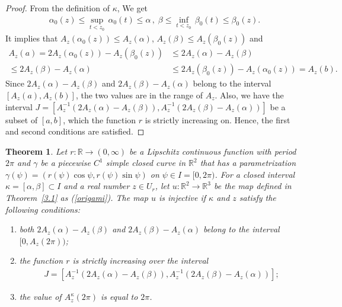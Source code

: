\documentclass{amsart}
\theoremstyle{plain}
\newtheorem{theorem}{Theorem}[section]
\theoremstyle{definition}
\theoremstyle{remark}
\begin{document}
\begin{proof}
From the definition of $\kappa$, We get
\begin{align*}
\alpha_0(z)\le\sup_{t<z_0}\,\alpha_0(t)\le\alpha\,,\;\beta\le\inf_{t<z_0}\,\beta_0(t)\le\beta_0(z).
\end{align*}
It implies that $A_z(\alpha_0(z))\le A_z(\alpha)$, $A_z(\beta)\le A_z(\beta_0(z))$ and
\begin{align*}
A_z(a)=2A_z(\alpha_0(z))-A_z(\beta_0(z))&\le2A_z(\alpha)-A_z(\beta)\\
\le2A_z(\beta)-A_z(\alpha)&\le2A_z(\beta_0(z))-A_z(\alpha_0(z))=A_z(b).
\end{align*}
Since $2A_z(\alpha)-A_z(\beta)$ and $2A_z(\beta)-A_z(\alpha)$ belong to the interval $[A_z(a),A_z(b)]$, the two values are in the range of $A_z$.
Also, we have the interval $J=[A_z^{-1}(2A_z(\alpha)-A_z(\beta)),A_z^{-1}(2A_z(\beta)-A_z(\alpha))]$ be a subset of $[a,b]$, which the function $r$ is strictly increasing on.
Hence, the first and second conditions are satisfied.
\end{proof}







\begin{theorem}\label{4.4} %
Let $r \colon \mathbb{R}\to(0,\infty)$ be a Lipschitz continuous function with period $2\pi$ and $\gamma$ be a piecewise $C^1$ simple closed curve in $\mathbb{R}^2$ that has a parametrization $\gamma(\psi)=(r(\psi)\cos\psi,r(\psi)\sin\psi)$ on $\psi\in I=[0,2\pi)$. 
For a closed interval $\kappa=[\alpha,\beta]\subset I$ and a real number $z\in U_r$, let $u \colon \mathbb{R}^2\to\mathbb{R}^3$ be the map defined in Theorem~\ref{3.1} as (\ref{origami}).
The map $u$ is injective if $\kappa$ and $z$ satisfy the following conditions:
\begin{enumerate}
\item both $2A_z(\alpha)-A_z(\beta)$ and $2A_z(\beta)-A_z(\alpha)$ belong to the interval $[0,A_z(2\pi))$;
\item the function $r$ is strictly increasing over the interval
\begin{align*}
J=[A_z^{-1}(2A_z(\alpha)-A_z(\beta)),A_z^{-1}(2A_z(\beta)-A_z(\alpha))];
\end{align*}
\item the value of $A_z^{\kappa}(2\pi)$ is equal to $2\pi$.
\end{enumerate}
\end{theorem}
\end{document}
